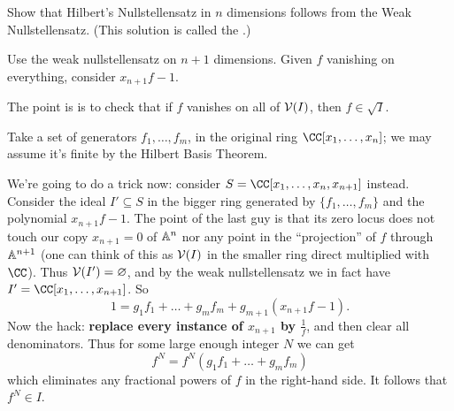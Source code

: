 \begin{problem}
	\kurumi
	Show that Hilbert's Nullstellensatz in $n$ dimensions
	follows from the Weak Nullstellensatz.
	(This solution is called the .)
	\begin{hint}
		Use the weak nullstellensatz on $n+1$ dimensions.
		Given $f$ vanishing on everything,
		consider $x_{n+1}f-1$. 
	\end{hint}
	\begin{sol}
		The point is is to check that if $f$ vanishes on all of $\mathcal V(I)$,
		then $f \in \sqrt I$.

		Take a set of generators $f_1, \dots, f_m$,
		in the original ring $\CC[x_1, \dots, x_n]$;
		we may assume it's finite by the Hilbert Basis Theorem.

		We're going to do a trick now:
		consider $S = \CC[x_1, \dots, x_n, x_{n+1}]$ instead.
		Consider the ideal $I' \subseteq S$ in the bigger ring
		generated by $\{f_1, \dots, f_m\}$ and the polynomial $x_{n+1} f - 1$.
		The point of the last guy is that its zero locus
		does not touch our copy $x_{n+1}=0$ of $\mathbb A^n$
		nor any point in the ``projection'' of $f$ through $\mathbb A^{n+1}$
		(one can think of this as $\mathcal V(I)$ in the smaller ring
		direct multiplied with $\CC$).
		Thus $\mathcal V(I') = \varnothing$, and by the weak nullstellensatz
		we in fact have $I' = \CC[x_1, \dots, x_{n+1}]$.
		So
		\[ 1 = g_1f_1 + \dots + g_mf_m + g_{m+1} \left( x_{n+1}f-1 \right). \]
		Now the hack: \textbf{replace every instance of $x_{n+1}$ by $\frac 1f$},
		and then clear all denominators.
		Thus for some large enough integer $N$ we can get
		\[ f^N = f^N(g_1f_1 + \dots + g_mf_m) \]
		which eliminates any fractional powers of $f$ in the right-hand side.
		It follows that $f^N \in I$.
	\end{sol}
\end{problem}

